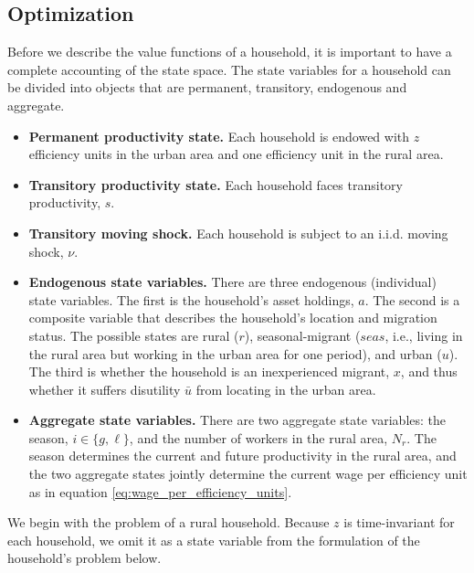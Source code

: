 \documentclass[12pt,pdftex]{article}
\begin{document}
\subsection{Optimization}

Before we describe the value functions of a household, it is important to have a complete accounting of the state space. The state variables for a household can be divided into objects that are permanent, transitory, endogenous and aggregate.
\begin{itemize}
\item \textbf{Permanent productivity state.} Each household is endowed with $z$ efficiency units in the urban area and one efficiency unit in the rural area.

\item \textbf{Transitory productivity state.} Each household faces transitory productivity, $s$.

\item \textbf{Transitory moving shock.} Each household is subject to an i.i.d. moving shock, $\nu$.

\item \textbf{Endogenous state variables.} There are three endogenous (individual) state variables. The first is the household's asset holdings, $a$. The second is a composite variable that describes the household's location and migration status. The possible states are rural ($r$), seasonal-migrant ($seas$, i.e., living in the rural area but working in the urban area for one period), and urban ($u$). The third is whether the household is an inexperienced migrant, $x$, and thus whether it suffers disutility $\bar u$ from locating in the urban area.

\item \textbf{Aggregate state variables.} There are two aggregate state variables: the season, $i \in \{g,\ell \}$, and the number of workers in the rural area, $N_r$. The season determines the current and future productivity in the rural area, and the two aggregate states jointly determine the current wage per efficiency unit as in equation \eqref{eq:wage_per_efficiency_units}.
\end{itemize}
We begin with the problem of a rural household. Because $z$ is time-invariant for each household, we omit it as a state variable from the formulation of the household's problem below.
\end{document}
